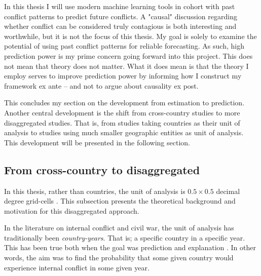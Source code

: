 \documentclass[a4paper]{article}
\begin{document}
In this thesis I will use modern machine learning tools in cohort with past conflict patterns to predict future conflicts. A "causal" discussion regarding whether conflict can be considered truly contagious is both interesting and worthwhile, but it is not the focus of this thesis. My goal is solely to examine the potential of using past conflict patterns for reliable forecasting. As such, high prediction power is my prime concern going forward into this project. This does not mean that theory does not matter. What it does mean is that the theory I employ serves to improve prediction power by informing how I construct my framework ex ante -- and not to argue about causality ex post.\par 

This concludes my section on the development from estimation to prediction. Another central development is the shift from cross-country studies to more disaggregated studies. That is, from studies taking countries as their unit of analysis to studies using much smaller geographic entities as unit of analysis. This development will be presented in the following section.\par


\subsection{From cross-country to disaggregated} %

In this thesis, rather than countries, the unit of analysis is $0.5\times0.5$ decimal degree grid-cells . This subsection presents the theoretical background and motivation for this disaggregated approach.\par

In the literature on internal conflict and civil war, the unit of analysis has traditionally been \emph{country-years}. That is; a specific country in a specific year. This has been true both when the goal was prediction \citep{Goldstone_2010, mueller_2016} and explanation \citep{Collier_Hoeffler_1998, Fearon_Laitin_2003, Collier_Hoeffler_2004, Hegre_Sambanis_2006}. In other words, the aim was to find the probability that some given country would experience internal conflict in some given year.\par
\end{document}
